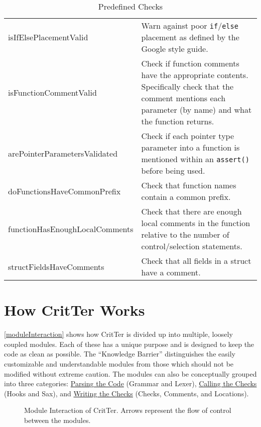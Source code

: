 \documentclass[12pt]{report}
\newcommand{\programName}{CritTer\xspace}
\begin{document}
\begin{table}
\begin{center}
\begin{tabular}{p{5.4cm} p{8.8cm}}
		isIfElsePlacementValid & Warn against poor \lstinline!if!\slash\lstinline!else! placement as defined by the Google style guide. \\
		isFunctionCommentValid & Check if function comments have the appropriate contents. Specifically check that the comment mentions each parameter (by name) and what the function returns. \\
		arePointerParametersValidated & Check if each pointer type parameter into a function is mentioned within an \lstinline!assert()! before being used. \\
		doFunctionsHaveCommonPrefix & Check that function names contain a common prefix. \\
		functionHasEnoughLocal\-Comments & Check that there are enough local comments in the function relative to the number of control/selection statements. \\
		structFieldsHaveComments & Check that all fields in a struct have a comment. \\
		\bottomrule
	\end{tabular}
	\end{center}
\caption{Predefined Checks}
\label{predefinedChecks}
\end{table}

\chapter{How \programName Works}
\label{howItWorks}

\autoref{moduleInteraction} shows how \programName is divided up into multiple, loosely coupled 
modules. Each of these has a unique purpose and is designed to keep the code as clean as possible. 
The ``Knowledge Barrier'' distinguishes the easily customizable and understandable modules from 
those which should not be modified without extreme caution. The modules can also be conceptually 
grouped into three categories: \hyperref[parsingTheCode]{Parsing the Code} (Grammar and Lexer), 
\hyperref[callingTheChecks]{Calling the Checks} (Hooks and Sax), and 
\hyperref[writingTheChecks]{Writing the Checks} (Checks, Comments, and Locations).

\begin{figure}[h!]
\begin{center}
\end{center}
\caption[Module Interaction of \programName]{Module Interaction of \programName. Arrows represent the flow of control between the modules.}
\label{moduleInteraction}
\end{figure}
\end{document}
